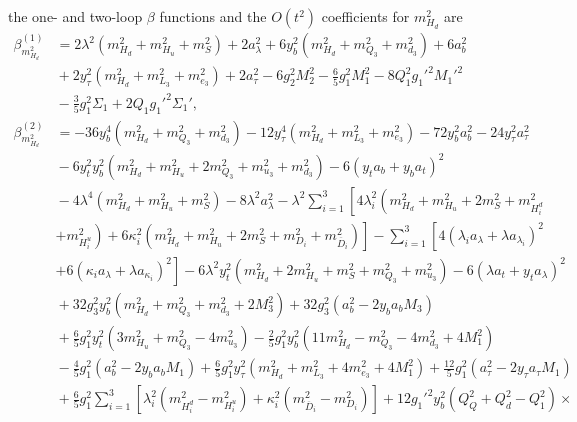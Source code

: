\documentclass[preprint,amsmath,amssymb,aps,superscriptaddress,prd,showpacs,floatfix,nofootinbib]{revtex4-1}
\begin{document}
the one- and two-loop $\beta$ functions and the $O(t^2)$ coefficients for $m_{H_d}^2$ are
\begin{subequations}
\begin{align}
\beta_{m_{H_d}^2}^{(1)}&=2\lambda^2\left ( m_{H_d}^2+m_{H_u}^2+m_S^2\right )+2a_\lambda^2+6y_b^2\left ( m_{H_d}^2+m_{Q_3}^2+m_{d_3}^2\right )+6a_b^2\nonumber\\
&{}+2y_\tau^2\left ( m_{H_d}^2+m_{L_3}^2+m_{e_3}^2\right )+2a_\tau^2-6g_2^2 M_2^2-\frac{6}{5}g_1^2 M_1^2-8Q_1^2g_1'^2 M_1'^2\nonumber\\
&{}-\frac{3}{5}g_1^2\Sigma_1+2Q_1g_1'^2\Sigma_1',\label{eq:USSMmHd2BetaOneLoop}\\
\beta_{m_{H_d}^2}^{(2)}&=-36y_b^4\left ( m_{H_d}^2+m_{Q_3}^2+m_{d_3}^2\right )-12y_\tau^4\left ( m_{H_d}^2+m_{L_3}^2+m_{e_3}^2\right )-72y_b^2a_b^2-24y_\tau^2a_\tau^2\nonumber\\
&{}-6y_t^2y_b^2\left ( m_{H_d}^2+m_{H_u}^2+2m_{Q_3}^2+m_{u_3}^2+m_{d_3}^2\right )-6\left ( y_t a_b+y_ba_t\right )^2\nonumber\\
&{}-4\lambda^4\left ( m_{H_d}^2+m_{H_u}^2+m_S^2\right )-8\lambda^2a_\lambda^2-\lambda^2\sum_{i=1}^3\left [ 4\lambda_i^2\left ( m_{H_d}^2+m_{H_u}^2+2m_S^2+m_{H_i^d}^2\right.\right.\nonumber\\
&{}\left.\left.+m_{H_i^u}^2\right )+6\kappa_i^2\left ( m_{H_d}^2+m_{H_u}^2+2m_S^2+m_{D_i}^2+m_{\overline{D}_i}^2\right )\right ]-\sum_{i=1}^3\left [ 4\left ( \lambda_i a_{\lambda}+\lambda a_{\lambda_i}\right )^2\right.\nonumber\\
&{}\left.+6\left ( \kappa_ia_\lambda+\lambda a_{\kappa_i}\right )^2\right ]-6\lambda^2y_t^2\left ( m_{H_d}^2+2m_{H_u}^2+m_S^2+m_{Q_3}^2+m_{u_3}^2\right )-6\left ( \lambda a_t+y_ta_\lambda\right )^2\nonumber\\
&{}+32g_3^2y_b^2\left ( m_{H_d}^2+m_{Q_3}^2+m_{d_3}^2+2M_3^2\right )+32g_3^2\left ( a_b^2-2y_ba_bM_3\right )\nonumber\\
&{}+\frac{6}{5}g_1^2y_t^2\left ( 3m_{H_u}^2+m_{Q_3}^2-4m_{u_3}^2\right )-\frac{2}{5}g_1^2y_b^2\left ( 11m_{H_d}^2-m_{Q_3}^2-4m_{d_3}^2+4M_1^2\right )\nonumber\\
&{}-\frac{4}{5}g_1^2\left ( a_b^2-2y_ba_bM_1\right )+\frac{6}{5}g_1^2y_\tau^2\left ( m_{H_d}^2+m_{L_3}^2+4m_{e_3}^2+4M_1^2\right )+\frac{12}{5}g_1^2\left ( a_\tau^2-2y_\tau a_\tau M_1\right )\nonumber\\
&{}+\frac{6}{5}g_1^2\sum_{i=1}^3\left [ \lambda_i^2\left ( m_{H_i^d}^2-m_{H_i^u}^2\right )+\kappa_i^2\left ( m_{\overline{D}_i}^2-m_{D_i}^2\right )\right ]+12g_1'^2y_b^2\left ( Q_Q^2+Q_d^2-Q_1^2\right )\times\nonumber\\

\end{align}
\end{subequations}
\end{document}
